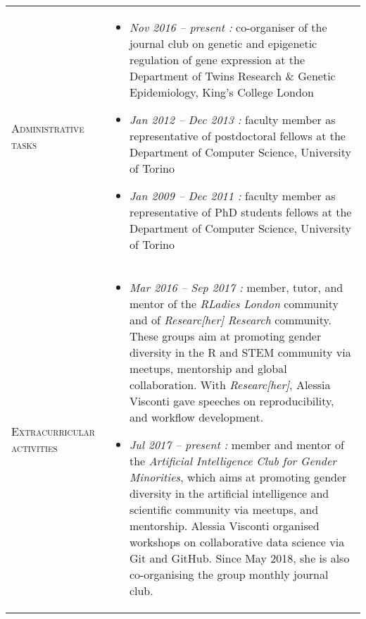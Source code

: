 \documentclass[a4paper,10pt]{article}
\newenvironment{doubletablelist}
{
	\vspace{-0.2cm}
	\begin{longtable}[!h]{AB}}{\end{longtable}
}
\newcommand{\dtlist}[2]{
\hspace{-3cm}
\noindent
	\begin{minipage}{0.24\textwidth}
	\begin{flushright}
	\textsc{#1}
	\end{flushright}
	\end{minipage}
	& #2\\[0.2cm]
}
\newcommand{\minusitem}{\item[-]}
\begin{document}
\begin{doubletablelist}



\dtlist{Administrative tasks}{
	\vspace{-0.6cm}
	\begin{itemize}[itemsep=-0.5ex]
		\minusitem  \emph{Nov 2016 -- present : } co-organiser of the journal club on genetic and epigenetic regulation of gene expression at the Department of Twins Research \& Genetic Epidemiology, King's College London
		\minusitem  \emph{Jan 2012 -- Dec 2013 : } faculty member as representative of postdoctoral fellows at the Department of Computer Science, University of Torino
		\minusitem  \emph{Jan 2009 -- Dec 2011 : } faculty member as representative of PhD students fellows at the Department of Computer Science, University of Torino
	\end{itemize}
}


\dtlist{Extracurricular activities}{
	\vspace{-0.9cm}
	\begin{itemize}[itemsep=-0.5ex]
		\minusitem  \emph{Mar 2016 -- Sep 2017 : } member, tutor, and mentor of the \emph{RLadies London} community and of \emph{Researc[her] Research} community. These groups aim at promoting gender diversity in the R and STEM community via meetups, mentorship and global collaboration. With \emph{Researc[her]}, Alessia Visconti gave speeches on reproducibility, and workflow development. 
		\minusitem \emph{Jul 2017 -- present : } member and mentor of the \emph{Artificial Intelligence Club for Gender Minorities}, which aims at promoting gender diversity in the artificial intelligence and scientific community via meetups, and mentorship. Alessia Visconti organised workshops on collaborative data science via Git and GitHub. Since May 2018, she is also co-organising the group monthly journal club.
	\end{itemize}
}


\end{doubletablelist}
\end{document}
